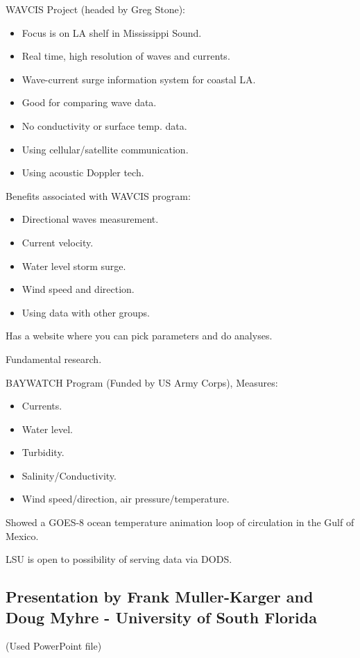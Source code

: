 WAVCIS Project (headed by Greg Stone):
\begin{itemize}
\item Focus is on LA shelf in Mississippi Sound.
\item Real time, high resolution of waves and currents.
\item Wave-current surge information system for coastal LA.
\item Good for comparing wave data.
\item No conductivity or surface temp. data.
\item Using cellular/satellite communication.
\item Using acoustic Doppler tech.
\end{itemize}

Benefits associated with WAVCIS program:
\begin{itemize}
\item Directional waves measurement.
\item Current velocity.
\item Water level storm surge.
\item Wind speed and direction.
\item Using data with other groups.
\end{itemize}

Has a website where you can pick parameters and do analyses.

Fundamental research.

BAYWATCH Program (Funded by US Army Corps), Measures:
\begin{itemize}
\item Currents.
\item Water level.
\item Turbidity.
\item Salinity/Conductivity.
\item Wind speed/direction, air pressure/temperature.
\end{itemize}

Showed a GOES-8 ocean temperature animation loop of circulation in the Gulf of Mexico.

LSU is open to possibility of serving data via DODS.

\subsection{Presentation by Frank Muller-Karger and Doug Myhre - University of South Florida}

(Used PowerPoint file)

